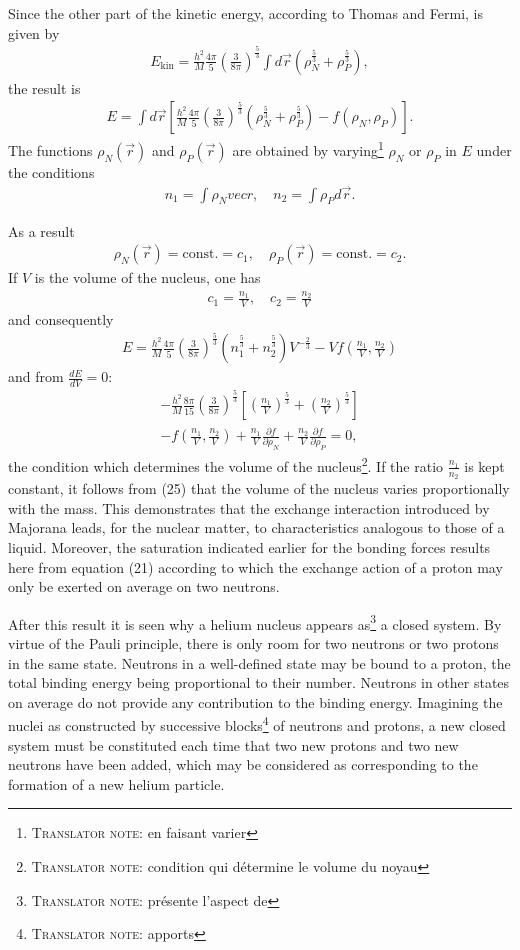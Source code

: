 \documentclass[a4paper,11pt]{article}
\newcommand{\?}[2]{#1\footnote{\textsc{Translator note}: #2}}
\newcommand{\nequ}[2]{\begin{align*}\tag{#1}#2\end{align*}}
\newcommand{\uequ}[1]{\begin{align*}#1\end{align*}}
\newcommand{\pXpY}[2]{\frac{\partial #1}{\partial #2}}
\newcommand{\dXdY}[2]{\frac{d{#1}}{{d{#2}}}}
\begin{document}
{{Since the other part of the kinetic energy, according to Thomas and Fermi, is given by
\uequ{
E_\text{kin} = \frac{h^2}{M}\frac{4\pi}{5}\left(\frac{3}{8\pi}\right)^\frac{5}{3}
\int d\vec{r}\left(\rho_N^\frac{5}{3} + \rho_P^\frac{5}{3}\right),
}
the result is
\nequ{22}{
E = \int d\vec{r}\left[\frac{h^2}{M}\frac{4\pi}{5}
\left(\frac{3}{8\pi}\right)^\frac{5}{3}
\left(\rho_N^\frac{5}{3} + \rho_P^\frac{5}{3}\right)
 - f(\rho_N, \rho_P)\right].
}
The functions $\rho_N(\vec{r})$ and $\rho_P(\vec{r})$ are obtained \?{by varying}{en faisant varier} $\rho_N$ or $\rho_P$ in $E$ under the conditions
\nequ{23}{
n_1 = \int\rho_N vec{r}, \quad n_2 = \int\rho_P d\vec{r}.
}

As a result
\uequ{
\rho_N(\vec{r}) = \text{const.} = c_1,\quad
\rho_P(\vec{r}) = \text{const.} = c_2.
}
If $V$ is the volume of the nucleus, one has
\uequ{
c_1 = \frac{n_1}{V},\quad
c_2 = \frac{n_2}{V}
}
and consequently
\nequ{24}{
E = \frac{h^2}{M}\frac{4\pi}{5}\left(\frac{3}{8\pi}\right)^\frac{5}{3}
\left(n_1^\frac{5}{3} + n_2^\frac{5}{3}\right)V^{-\frac{2}{3}}
 - Vf\left(\frac{n_1}{V}, \frac{n_2}{V}\right)
}
and from $\dXdY{E}{V} = 0$:
\nequ{25}{
-\frac{h^2}{M}\frac{8\pi}{15}\left(\frac{3}{8\pi}\right)^\frac{5}{3}
\left[\left(\frac{n_1}{V}\right)^\frac{5}{3} + \left(\frac{n_2}{V}\right)^\frac{5}{3}\right]\\
- f\left(\frac{n_1}{V}, \frac{n_2}{V}\right) + \frac{n_1}{V}\pXpY{f}{\rho_N}
+ \frac{n_2}{V}\pXpY{f}{\rho_P} = 0,
}
\?{the condition which determines the volume of the nucleus}{condition qui détermine le volume du noyau}. If the ratio $\frac{n_1}{n_2}$ is kept constant, it follows from (25) that the volume of the nucleus varies proportionally with the mass. This demonstrates that the exchange interaction introduced by Majorana leads, for the nuclear matter, to characteristics analogous to those of a liquid. Moreover, the saturation indicated earlier for the bonding forces results here from equation (21) according to which the exchange action of a proton may only be exerted on average on two neutrons.

After this result it is seen why a helium nucleus \?{appears as}{présente l'aspect de} a closed system. By virtue of the Pauli principle, there is only room for two neutrons or two protons in the same state. Neutrons in a well-defined state may be bound to a proton, the total binding energy being proportional to their number. Neutrons in other states on average do not provide any contribution to the binding energy. Imagining the nuclei as constructed by successive \?{blocks}{apports} of neutrons and protons, a new closed system must be constituted each time that two new protons and two new neutrons have been added, which may be considered as corresponding to the formation of a new helium particle.

}}
\end{document}
